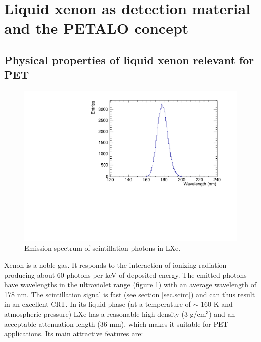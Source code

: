 \documentclass[review]{elsarticle}
\begin{document}
\section{Liquid xenon as detection material and the PETALO concept}
\label{sec.LXe}


\subsection*{Physical properties of liquid xenon relevant for PET}


\begin{figure}[!bhtp]
	\centering
	\includegraphics[scale=0.5]{../img/ScintillationSpectrumLXe.pdf}
	\caption{\label{fig.spectrumLXe} Emission spectrum of scintillation photons in LXe.}
\end{figure}

Xenon is a noble gas. It responds to the interaction of ionizing radiation producing about 60 photons per keV of deposited energy. The emitted photons have wavelengths in the ultraviolet range 
(figure \ref{fig.spectrumLXe}) with an average wavelength of 178 nm. The scintillation signal is fast 
(see section \ref{sec.scint}) and can thus result in an excellent CRT.  In its liquid phase (at a temperature of $\sim$ 160 K and atmospheric pressure) LXe has a reasonable high density (3 g/cm$^3$) and an acceptable attenuation length (36 mm), which makes it suitable for PET applications. Its main attractive features are:
\end{document}
